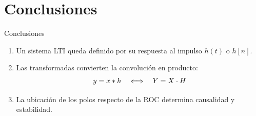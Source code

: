 \section{Conclusiones}

\begin{frame}{Conclusiones}
  \begin{enumerate}
    \item Un sistema LTI queda definido por su respuesta al impulso $h(t)$ o $h[n]$.
    \item<2-> Las transformadas convierten la convolución en producto:
      \[
        y = x \ast h \quad\Longleftrightarrow\quad Y = X \cdot H
      \]
    \item<3-> La ubicación de los polos respecto de la ROC determina causalidad y estabilidad.
  \end{enumerate}

\end{frame}
